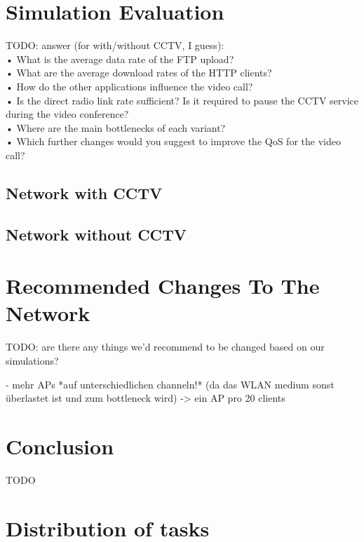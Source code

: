 \documentclass[
10pt, %
a4paper, %
oneside, %
headinclude,footinclude, %
BCOR5mm, %
]{scrartcl}
\begin{document}
\section{Simulation Evaluation}
TODO: answer (for with/without CCTV, I guess):\\
• What is the average data rate of the FTP upload?\\
• What are the average download rates of the HTTP clients?\\
• How do the other applications influence the video call?\\
• Is the direct radio link rate sufficient? Is it required to pause the CCTV service during the video conference?\\
• Where are the main bottlenecks of each variant?\\
• Which further changes would you suggest to improve the QoS for the video call?\\

\subsection{Network with CCTV}


\subsection{Network without CCTV}

\section{Recommended Changes To The Network}
TODO: are there any things we'd recommend to be changed based on our simulations?

- mehr APs *auf unterschiedlichen channeln!* (da das WLAN medium sonst überlastet ist und zum bottleneck wird) -> ein AP pro 20 clients

\section{Conclusion}
TODO

\newpage

\section{Distribution of tasks}
\end{document}
